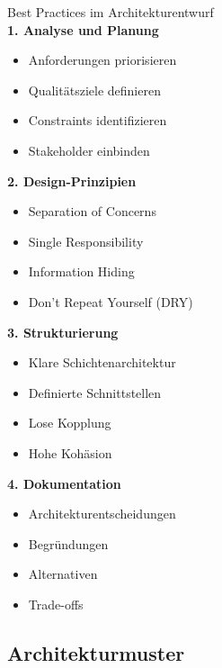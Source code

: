 \begin{KR}{Best Practices im Architekturentwurf}\\
\textbf{1. Analyse und Planung}
\begin{itemize}
    \item Anforderungen priorisieren
    \item Qualitätsziele definieren
    \item Constraints identifizieren
    \item Stakeholder einbinden
\end{itemize}

\textbf{2. Design-Prinzipien}
\begin{itemize}
    \item Separation of Concerns
    \item Single Responsibility
    \item Information Hiding
    \item Don't Repeat Yourself (DRY)
\end{itemize}

\textbf{3. Strukturierung}
\begin{itemize}
    \item Klare Schichtenarchitektur
    \item Definierte Schnittstellen
    \item Lose Kopplung
    \item Hohe Kohäsion
\end{itemize}

\textbf{4. Dokumentation}
\begin{itemize}
    \item Architekturentscheidungen
    \item Begründungen
    \item Alternativen
    \item Trade-offs
\end{itemize}
\end{KR}

\subsection{Architekturmuster}


